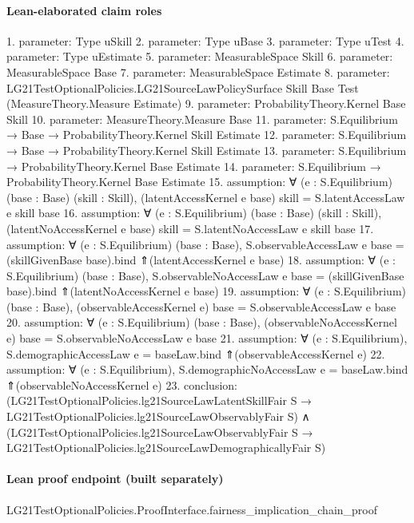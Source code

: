 \documentclass[10pt]{article}
\begin{document}
\paragraph{Lean-elaborated claim roles}\begin{ReviewVerbatim}
1. parameter: Type uSkill
2. parameter: Type uBase
3. parameter: Type uTest
4. parameter: Type uEstimate
5. parameter: MeasurableSpace Skill
6. parameter: MeasurableSpace Base
7. parameter: MeasurableSpace Estimate
8. parameter: LG21TestOptionalPolicies.LG21SourceLawPolicySurface Skill Base Test (MeasureTheory.Measure Estimate)
9. parameter: ProbabilityTheory.Kernel Base Skill
10. parameter: MeasureTheory.Measure Base
11. parameter: S.Equilibrium → Base → ProbabilityTheory.Kernel Skill Estimate
12. parameter: S.Equilibrium → Base → ProbabilityTheory.Kernel Skill Estimate
13. parameter: S.Equilibrium → ProbabilityTheory.Kernel Base Estimate
14. parameter: S.Equilibrium → ProbabilityTheory.Kernel Base Estimate
15. assumption: ∀ (e : S.Equilibrium) (base : Base) (skill : Skill), (latentAccessKernel e base) skill = S.latentAccessLaw e skill base
16. assumption: ∀ (e : S.Equilibrium) (base : Base) (skill : Skill),
  (latentNoAccessKernel e base) skill = S.latentNoAccessLaw e skill base
17. assumption: ∀ (e : S.Equilibrium) (base : Base),
  S.observableAccessLaw e base = (skillGivenBase base).bind ⇑(latentAccessKernel e base)
18. assumption: ∀ (e : S.Equilibrium) (base : Base),
  S.observableNoAccessLaw e base = (skillGivenBase base).bind ⇑(latentNoAccessKernel e base)
19. assumption: ∀ (e : S.Equilibrium) (base : Base), (observableAccessKernel e) base = S.observableAccessLaw e base
20. assumption: ∀ (e : S.Equilibrium) (base : Base), (observableNoAccessKernel e) base = S.observableNoAccessLaw e base
21. assumption: ∀ (e : S.Equilibrium), S.demographicAccessLaw e = baseLaw.bind ⇑(observableAccessKernel e)
22. assumption: ∀ (e : S.Equilibrium), S.demographicNoAccessLaw e = baseLaw.bind ⇑(observableNoAccessKernel e)
23. conclusion: (LG21TestOptionalPolicies.lg21SourceLawLatentSkillFair S → LG21TestOptionalPolicies.lg21SourceLawObservablyFair S) ∧
  (LG21TestOptionalPolicies.lg21SourceLawObservablyFair S → LG21TestOptionalPolicies.lg21SourceLawDemographicallyFair S)
\end{ReviewVerbatim}

\paragraph{Lean proof endpoint (built separately)}\begin{ReviewVerbatim}
LG21TestOptionalPolicies.ProofInterface.fairness_implication_chain_proof
\end{ReviewVerbatim}
\end{document}
